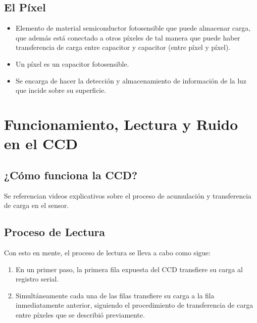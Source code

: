 \documentclass{article}
\begin{document}


\subsection{El Píxel}
\begin{itemize}
    \item Elemento de material semiconductor fotosensible que puede almacenar carga, que además está conectado a otros píxeles de tal manera que puede haber transferencia de carga entre capacitor y capacitor (entre píxel y píxel).
    \item Un píxel es un capacitor fotosensible.
    \item Se encarga de hacer la detección y almacenamiento de información de la luz que incide sobre su superficie.
\end{itemize}


\section{Funcionamiento, Lectura y Ruido en el CCD}

\subsection{¿Cómo funciona la CCD?}
Se referencian videos explicativos sobre el proceso de acumulación y transferencia de carga en el sensor.


\subsection{Proceso de Lectura}
Con esto en mente, el proceso de lectura se lleva a cabo como sigue:

\begin{enumerate}
    \item En un primer paso, la primera fila expuesta del CCD transfiere su carga al registro serial.
    \item Simultáneamente cada una de las filas transfiere su carga a la fila inmediatamente anterior, siguiendo el procedimiento de transferencia de carga entre píxeles que se describió previamente.
\end{enumerate}


\end{document}
